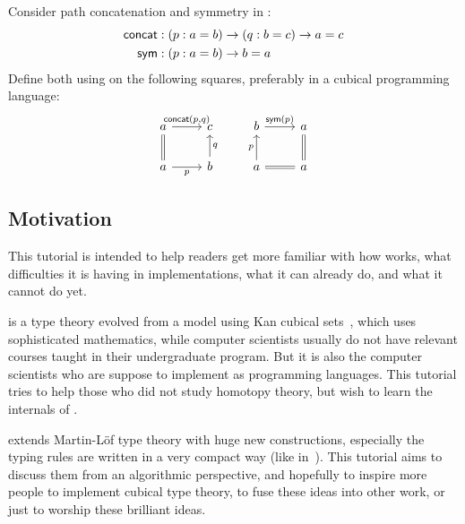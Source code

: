 \begin{exercise}\label{ex:concat-sym}
Consider path concatenation and symmetry in \CTT{}:
\begin{align*}
\textsf{concat}&:(p:a=b)\to(q:b=c)\to{a=c}\\
\textsf{sym}&:(p:a=b)\to{b=a}
\end{align*}
Define both using \hcomp{} on the following squares,
preferably in a cubical programming language:
\[\begin{tikzcd}
	a & c & b & a \\
	a & b & a & a
	\arrow["{\concat(p, q)}", from=1-1, to=1-2]
	\arrow[Rightarrow, no head, from=2-1, to=1-1]
	\arrow["p"', from=2-1, to=2-2]
	\arrow["q"', from=2-2, to=1-2]
	\arrow["p", from=2-3, to=1-3]
	\arrow[Rightarrow, no head, from=2-3, to=2-4]
	\arrow[Rightarrow, no head, from=2-4, to=1-4]
	\arrow["{\sym(p)}", from=1-3, to=1-4]
\end{tikzcd}\]
\end{exercise}
\subsection{Motivation}
This tutorial is intended to help readers get more familiar with how
\CTT{} works, what difficulties it is having in implementations,
what it can already do, and what it cannot do yet.

\CTT{} is a type theory evolved from a model using Kan cubical sets~\cite{CubicalSets},
which uses sophisticated mathematics, while computer scientists
usually do not have relevant courses taught in their undergraduate program.
But it is also the computer scientists who are suppose to implement \CTT{} as
programming languages. This tutorial tries to help those who did not study homotopy
theory, but wish to learn the internals of \CTT.

\CTT{} extends Martin-L\"{o}f type theory with huge new constructions,
especially the typing rules are written in a very compact way (like in~\cite{HCompPDF}).
This tutorial aims to discuss them from an algorithmic perspective,
and hopefully to inspire more people to implement cubical type theory,
to fuse these ideas into other work, or just to worship these brilliant ideas.

